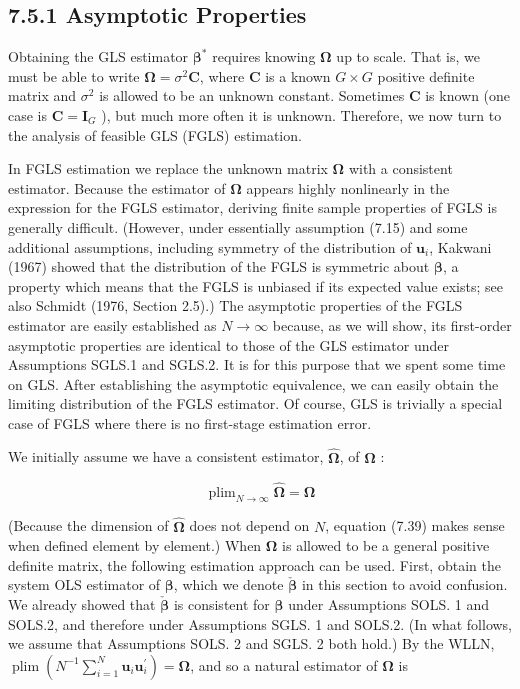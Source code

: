\documentclass[10pt]{article}
\begin{document}
\subsection*{7.5.1 Asymptotic Properties}
Obtaining the GLS estimator $\boldsymbol{\beta}^{*}$ requires knowing $\boldsymbol{\Omega}$ up to scale. That is, we must be able to write $\boldsymbol{\Omega}=\sigma^{2} \mathbf{C}$, where $\mathbf{C}$ is a known $G \times G$ positive definite matrix and $\sigma^{2}$ is allowed to be an unknown constant. Sometimes $\mathbf{C}$ is known (one case is $\mathbf{C}=\mathbf{I}_{G}$ ), but much more often it is unknown. Therefore, we now turn to the analysis of feasible GLS (FGLS) estimation.

In FGLS estimation we replace the unknown matrix $\boldsymbol{\Omega}$ with a consistent estimator. Because the estimator of $\boldsymbol{\Omega}$ appears highly nonlinearly in the expression for the FGLS estimator, deriving finite sample properties of FGLS is generally difficult. (However, under essentially assumption (7.15) and some additional assumptions, including symmetry of the distribution of $\mathbf{u}_{i}$, Kakwani (1967) showed that the distribution of the FGLS is symmetric about $\boldsymbol{\beta}$, a property which means that the FGLS is unbiased if its expected value exists; see also Schmidt (1976, Section 2.5).) The asymptotic properties of the FGLS estimator are easily established as $N \rightarrow \infty$ because, as we will show, its first-order asymptotic properties are identical to those of the GLS estimator under Assumptions SGLS.1 and SGLS.2. It is for this purpose that we spent some time on GLS. After establishing the asymptotic equivalence, we can easily obtain the limiting distribution of the FGLS estimator. Of course, GLS is trivially a special case of FGLS where there is no first-stage estimation error.

We initially assume we have a consistent estimator, $\hat{\boldsymbol{\Omega}}$, of $\boldsymbol{\Omega}$ :


\begin{equation*}
\operatorname{plim}_{N \rightarrow \infty} \hat{\boldsymbol{\Omega}}=\boldsymbol{\Omega} \tag{7.39}
\end{equation*}


(Because the dimension of $\hat{\boldsymbol{\Omega}}$ does not depend on $N$, equation (7.39) makes sense when defined element by element.) When $\boldsymbol{\Omega}$ is allowed to be a general positive definite matrix, the following estimation approach can be used. First, obtain the system OLS estimator of $\boldsymbol{\beta}$, which we denote $\check{\boldsymbol{\beta}}$ in this section to avoid confusion. We already showed that $\check{\boldsymbol{\beta}}$ is consistent for $\boldsymbol{\beta}$ under Assumptions SOLS. 1 and SOLS.2, and therefore under Assumptions SGLS. 1 and SOLS.2. (In what follows, we assume that Assumptions SOLS. 2 and SGLS. 2 both hold.) By the WLLN, $\operatorname{plim}\left(N^{-1} \sum_{i=1}^{N} \mathbf{u}_{i} \mathbf{u}_{i}^{\prime}\right)= \boldsymbol{\Omega}$, and so a natural estimator of $\boldsymbol{\Omega}$ is
\end{document}
